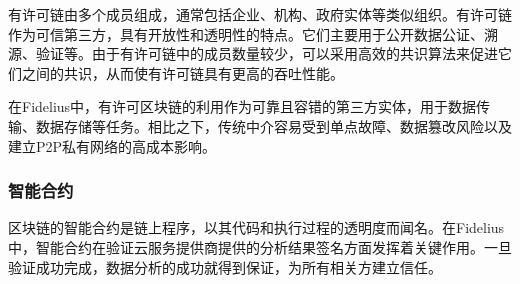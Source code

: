 有许可链由多个成员组成，通常包括企业、机构、政府实体等类似组织。有许可链作为可信第三方，具有开放性和透明性的特点。它们主要用于公开数据公证、溯源、验证等。由于有许可链中的成员数量较少，可以采用高效的共识算法来促进它们之间的共识，从而使有许可链具有更高的吞吐性能。

在Fidelius中，有许可区块链的利用作为可靠且容错的第三方实体，用于数据传输、数据存储等任务。相比之下，传统中介容易受到单点故障、数据篡改风险以及建立P2P私有网络的高成本影响。

\subsubsection{智能合约}
区块链的智能合约是链上程序，以其代码和执行过程的透明度而闻名。在Fidelius中，智能合约在验证云服务提供商提供的分析结果签名方面发挥着关键作用。一旦验证成功完成，数据分析的成功就得到保证，为所有相关方建立信任。 